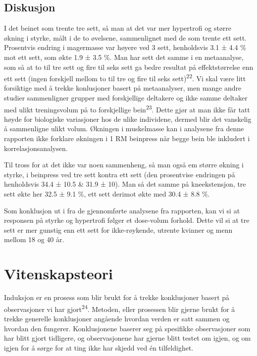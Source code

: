 \documentclass[
  letterpaper,
  DIV=11,
  numbers=noendperiod]{scrreprt}
\begin{document}
\section{Diskusjon}\label{diskusjon-5}

I det beinet som trente tre sett, så man at det var mer hypertrofi og
større økning i styrke, målt i de to øvelsene, sammenlignet med de som
trente ett sett. Prosentvis endring i magermasse var høyere ved 3 sett,
henholdsvis 3.1 ± 4.4 \% mot ett sett, som økte 1.9 ± 3.5 \%. Man har
sett det samme i en metaanalyse, som så at to til tre sett og fire til
seks sett ga bedre resultat på effektstørrelse enn ett sett (ingen
forskjell mellom to til tre og fire til seks sett)\textsuperscript{22}.
Vi skal være litt forsiktige med å trekke konlusjoner basert på
metaanalyser, men mange andre studier sammenligner grupper med
forskjellige deltakere og ikke samme deltaker med ulikt treningsvolum på
to forskjellige bein\textsuperscript{23}. Dette gjør at man ikke får
tatt høyde for biologiske variasjoner hos de ulike individene, dermed
blir det vanskelig å sammenligne ulikt volum. Økningen i muskelmasse kan
i analysene fra denne rapporten ikke forklare økningen i 1 RM beinpress
når begge bein ble inkludert i korrelasjonsanalysen.

Til tross for at det ikke var noen sammenheng, så man også em større
økning i styrke, i beinpress ved tre sett kontra ett sett (den
prosentvise endringen på henholdsvis 34.4 ± 10.5 \& 31.9 ± 10). Man så
det samme på kneekstensjon, tre sett økte her 32.5 ± 9.1 \%, ett sett
derimot økte med 30.4 ± 8.8 \%.

Som konklusjon ut i fra de gjennomførte analysene fra rapporten, kan vi
si at responsen på styrke og hypertrofi følger et dose-volum forhold.
Dette vil si at tre sett er mer gunstig enn ett sett for ikke-røykende,
utrente kvinner og menn mellom 18 og 40 år.


\chapter{Vitenskapsteori}\label{vitenskapsteori}

Induksjon er en prosess som blir brukt for å trekke konklusjoner basert
på observasjoner vi har gjort\textsuperscript{24}. Metoden, eller
prosessen blir gjerne brukt for å trekke generelle konklusjoner angående
hvordan verden er satt sammen og hvordan den fungerer. Konklusjonene
baserer seg på spesifikke observasjoner som har blitt gjort tidligere,
og observasjonene har gjerne blitt testet om igjen, og om igjen for å
sørge for at ting ikke har skjedd ved én tilfeldighet.
\end{document}
